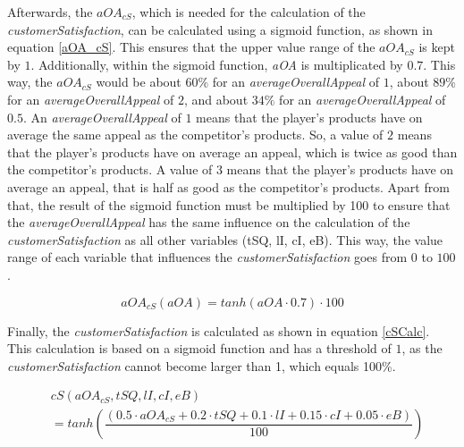 Afterwards, the $aOA_{cS}$, which is needed for the calculation of the \textit{customerSatisfaction}, can be calculated using a sigmoid function, as shown in equation \ref{aOA_cS}. This ensures that the upper value range of the $aOA_{cS}$ is kept by $1$.
Additionally, within the sigmoid function, \textit{aOA} is multiplicated by $0.7$. This way, the $aOA_{cS}$ would be about $60\%$ for an \textit{averageOverallAppeal} of $1$, about $89\%$ for an \textit{averageOverallAppeal} of $2$, and about $34\%$ for an \textit{averageOverallAppeal} of $0.5$. An \textit{averageOverallAppeal} of $1$ means that the player's products have on average the same appeal as the competitor's products. So, a value of $2$ means that the player's products have on average an appeal, which is twice as good than the competitor's products. A value of $3$ means that the player's products have on average an appeal, that is half as good as the competitor's products. 
Apart from that, the result of the sigmoid function must be multiplied by 100 to ensure that the \textit{averageOverallAppeal} has the same influence on the calculation of the \textit{customerSatisfaction} as all other variables (tSQ, lI, cI, eB). This way, the value range of each variable that influences the \textit{customerSatisfaction} goes from $0$ to $100$.

\begin{equation}
\label{aOA_cS}
   aOA_{cS}(aOA) = tanh(aOA \cdot 0.7) \cdot 100
\end{equation}

Finally, the \textit{customerSatisfaction} is calculated as shown in equation \ref{cSCalc}. This calculation is based on a sigmoid function and has a threshold of $1$, as the \textit{customerSatisfaction} cannot become larger than 1, which equals 100\%.

\begin{equation}
\begin{aligned}
\label{cSCalc}
    & cS(aOA_{cS}, tSQ, lI, cI, eB) \\
    & = tanh(\dfrac{(0.5 \cdot aOA_{cS} + 0.2 \cdot tSQ + 0.1 \cdot lI + 0.15 \cdot cI + 0.05 \cdot eB)}{100})
\end{aligned}   
\end{equation}



